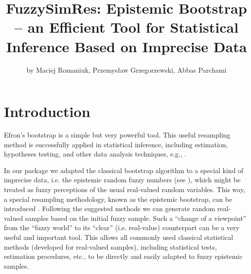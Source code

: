 

  \title{FuzzySimRes: Epistemic Bootstrap -- an Efficient Tool for Statistical Inference Based on Imprecise Data}
  \author{by Maciej Romaniuk, Przemys{\l}aw Grzegorzewski, Abbas Parchami}

  \maketitle





\section{Introduction}
\label{intro}

Efron's bootstrap \citep{EfroTibs93} is a simple but very powerful tool. This useful resampling method is successfully applied in statistical inference, including estimation, hypotheses testing, and other data analysis techniques, e.g., \cite{davison_hinkley_1997,ISLR,romaniuk2019}.

In our package  we adapted the classical bootstrap algorithm to a special kind of imprecise data, i.e. the epistemic random fuzzy numbers (see \cite{Couso2014}), which might be treated as fuzzy perceptions of the usual real-valued random variables.
This way, a special resampling methodology, known as the epistemic bootstrap, can be introduced \citep{grzegorzewski2021,10.1007/978-3-031-08974-9_39,pgmr2022}.
Following the suggested methods we can generate random real-valued samples based on the initial fuzzy sample.
Such a ``change of a viewpoint'' from the ``fuzzy world'' to its ``clear'' (i.e. real-value) counterpart can be a very useful and important tool.
This allows all commonly used classical statistical methods (developed for real-valued samples), including statistical tests, estimation procedures, etc., to be directly and easily adapted to fuzzy epistemic samples.





